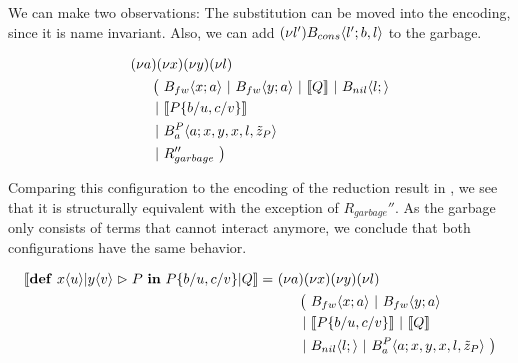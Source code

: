 We can make two observations:
The substitution can be moved into the encoding, since it is name invariant.
Also, we can add $\anew{l'}{\ains{B_{cons}}{l'}{b,l}}$ to the garbage.

\begin{align*}
  &\anew{a}{\anew{x}{\anew{y}{\anew{l}{ \\
    &\hspace{0.5cm}
    \begin{aligned}[t]
      \big(\ &\ains{B_{fw}}{x}{a}
      \apar   \ains{B_{fw}}{y}{a}
      \apar   \encMJtoAP{Q}
      \apar   \ains{B_{nil}}{l}{}
      \\
      \apar  &\encMJtoAP{P\substitution{\subst{b}{u},\subst{c}{v}}}
      \\
      \apar  &\ains{B_a^P}{a}{x, y, x, l,\tilde{z}_P}
      \\
      \apar  &R_{garbage}''
      \ \big)
    \end{aligned}
  }}}}
\end{align*}

Comparing this configuration to the encoding of the reduction result
in \joincalc,
we see that it is structurally equivalent with the exception of $R_{garbage}''$.
As the garbage only consists of terms that cannot interact anymore,
we conclude that both configurations have the same behavior.

\begin{align*}
  \encMJtoAP{\jdef{\jrct{\jrcv{x}{u} \jpat \jrcv{y}{v}}{P}}{P\substitution{\subst{b}{u},\subst{c}{v}} \jpar Q}}
  =\ &\anew{a}{\anew{x}{\anew{y}{\anew{l}{ \\
      &\hspace{0.5cm}
      \begin{aligned}[t]
        \big(\ &\ains{B_{fw}}{x}{a}
        \apar   \ains{B_{fw}}{y}{a} \\
        \apar  &\encMJtoAP{P\substitution{\subst{b}{u},\subst{c}{v}}} \apar \encMJtoAP{Q} \\
        \apar  &\ains{B_{nil}}{l}{}
        \apar   \ains{B_a^P}{a}{x, y, x, l, \tilde{z}_P}
        \ \big)
      \end{aligned}
    }}}}
\end{align*}
